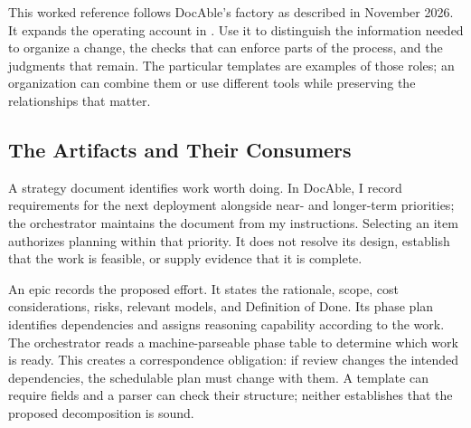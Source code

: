 
This worked reference follows DocAble's factory as described in November 2026. It expands the operating account in \href{5.2-inside-docables-software-factory.html}{}. Use it to distinguish the information needed to organize a change, the checks that can enforce parts of the process, and the judgments that remain. The particular templates are examples of those roles; an organization can combine them or use different tools while preserving the relationships that matter.

\subsection{The Artifacts and Their Consumers}\label{heading:the-artifacts-and-their-consumers}

A strategy document identifies work worth doing. In DocAble, I record requirements for the next deployment alongside near- and longer-term priorities; the orchestrator maintains the document from my instructions. Selecting an item authorizes planning within that priority. It does not resolve its design, establish that the work is feasible, or supply evidence that it is complete.

An epic records the proposed effort. It states the rationale, scope, cost considerations, risks, relevant models, and Definition of Done. Its phase plan identifies dependencies and assigns reasoning capability according to the work. The orchestrator reads a machine-parseable phase table to determine which work is ready. This creates a correspondence obligation: if review changes the intended dependencies, the schedulable plan must change with them. A template can require fields and a parser can check their structure; neither establishes that the proposed decomposition is sound.

